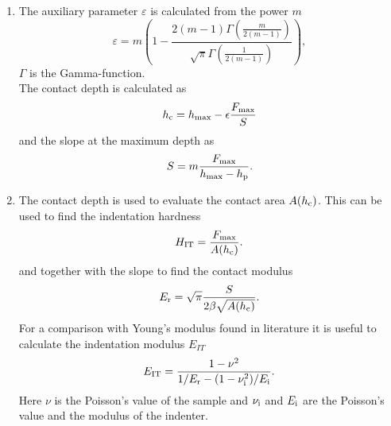 \begin{enumerate}
\item The auxiliary parameter $\varepsilon$ is calculated from the power $m$
\begin{equation} \label{eq:eps}
\varepsilon = m \left(1-\frac{2(m-1) \Gamma\left(\frac{m}{2(m-1)}\right)}{\sqrt{\pi}\Gamma\left(\frac{1}{2(m-1)}\right)} \right),
\end{equation}
$\Gamma$ is the Gamma-function. \\
The contact depth is calculated as 
\begin{equation} \label{eq:hc}
	h_\mathrm{c}=h_\mathrm{max}-\epsilon \frac{F_\mathrm{max}}{S}
\end{equation}
and the slope at the maximum depth as
\begin{equation} \label{eq:S}
S=m \frac{ F_\mathrm{max}}{h_\mathrm{max}-h_\mathrm{p}}.
\end{equation}
\item 
The contact depth is used to evaluate the contact area $A(h_\mathrm{c})$.
This can be used to find the indentation hardness
\begin{equation}\label{eq:Hit}
H_\mathrm{IT}=\frac{F_\mathrm{max}}{A(h_\mathrm{c})}.
\end{equation}
and together with the slope to find the contact modulus
\begin{equation}\label{eq:Er}
E_\mathrm{r}=\sqrt{\pi} \frac{S}{2 \beta \sqrt{A(h_\mathrm{c})}}.
\end{equation}
For a comparison with Young's modulus found in literature it is useful to calculate the indentation modulus $E_{IT}$ 
\begin{equation} \label{eq:Eit}
E_\mathrm{IT} = \frac{1 - \nu^2}{1/E_\mathrm{r} - (1 - \nu_\mathrm{i}^2) / E_\mathrm{i}}.
\end{equation}
Here $\nu$ is the Poisson's value of the sample and $\nu_\mathrm{i}$ and $E_\mathrm{i}$ are the Poisson's value and the modulus of the indenter. 
\end{enumerate} 
